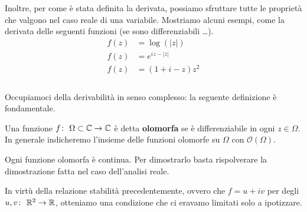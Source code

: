 Inoltre, per come è stata definita la derivata, possiamo sfruttare tutte le proprietà che valgono nel caso reale di una variabile. Mostriamo alcuni esempi, come la derivata delle seguenti funzioni (se sono differenziabili \dots). \\

	\begin{equation*} \begin{aligned}
	f(z) & = \log(|z|)   \\
	f(z) & = e^{iz - |z|}  \\
	f(z) & = (1 + i - z)z^2  \\
	\end{aligned} \end{equation*}
\\

Occupiamoci della derivabilità in senso complesso: la seguente definizione è fondamentale.

\begin{definition}
	Una funzione $f \colon\ \Omega \subset \mathbb{C} \rightarrow \mathbb{C}$ è detta \textbf{olomorfa} se è differenziabile in ogni $z \in \Omega$. \\ In generale indicheremo l'insieme delle funzioni olomorfe su $\Omega$ con $\mathcal{O}(\Omega)$.
\end{definition}

\begin{remark}
	Ogni funzione olomorfa è continua. Per dimostrarlo basta rispolverare la dimostrazione fatta nel caso dell'analisi reale.
\end{remark}

In virtù della relazione stabilità precedentemente, ovvero che $f = u + iv$ per degli $u,v \colon\ \mathbb{R}^2 \rightarrow \mathbb{R}$, otteniamo una condizione che ci eravamo limitati solo a ipotizzare.

